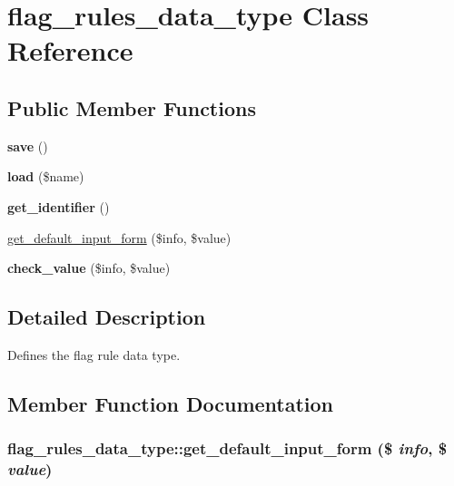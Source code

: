 \hypertarget{classflag__rules__data__type}{
\section{flag\_\-rules\_\-data\_\-type Class Reference}
\label{classflag__rules__data__type}
}
\subsection*{Public Member Functions}
\begin{CompactItemize}
\item 
\hypertarget{classflag__rules__data__type_fb170242a0cea6a2714a6ad17b714ea2}{
\textbf{save} ()}
\label{classflag__rules__data__type_fb170242a0cea6a2714a6ad17b714ea2}

\item 
\hypertarget{classflag__rules__data__type_6df12011e5c58a6c8361361c8686e053}{
\textbf{load} (\$name)}
\label{classflag__rules__data__type_6df12011e5c58a6c8361361c8686e053}

\item 
\hypertarget{classflag__rules__data__type_b8ece3e8f2f408d1dc2db3464a48be00}{
\textbf{get\_\-identifier} ()}
\label{classflag__rules__data__type_b8ece3e8f2f408d1dc2db3464a48be00}

\item 
\hyperlink{classflag__rules__data__type_8cac7dad8b78e3df333443de10a7a626}{get\_\-default\_\-input\_\-form} (\$info, \$value)
\item 
\hypertarget{classflag__rules__data__type_0f4ddbaa6997e923208e800e7682b5e5}{
\textbf{check\_\-value} (\$info, \$value)}
\label{classflag__rules__data__type_0f4ddbaa6997e923208e800e7682b5e5}

\end{CompactItemize}


\subsection{Detailed Description}
Defines the flag rule data type. 

\subsection{Member Function Documentation}
\hypertarget{classflag__rules__data__type_8cac7dad8b78e3df333443de10a7a626}{
\subsubsection[{get\_\-default\_\-input\_\-form}]{\setlength{\rightskip}{0pt plus 5cm}flag\_\-rules\_\-data\_\-type::get\_\-default\_\-input\_\-form (\$ {\em info}, \/  \$ {\em value})}}
\label{classflag__rules__data__type_8cac7dad8b78e3df333443de10a7a626}


